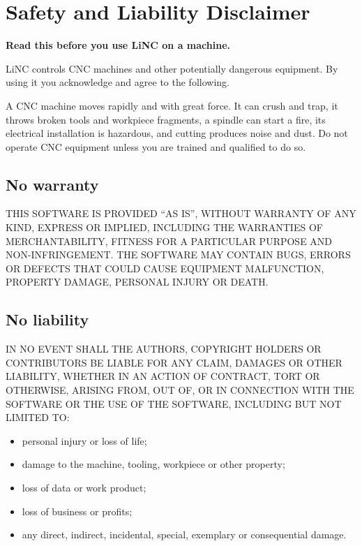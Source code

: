 \chapter*{Safety and Liability Disclaimer}

\textbf{Read this before you use LiNC on a machine.}

LiNC controls CNC machines and other potentially dangerous equipment. By using it you
acknowledge and agree to the following.

\begin{safetybox}
  A CNC machine moves rapidly and with great force. It can crush and trap, it throws broken
  tools and workpiece fragments, a spindle can start a fire, its electrical installation is
  hazardous, and cutting produces noise and dust. Do not operate CNC equipment unless you
  are trained and qualified to do so.
\end{safetybox}

\section*{No warranty}

THIS SOFTWARE IS PROVIDED ``AS IS'', WITHOUT WARRANTY OF ANY KIND, EXPRESS OR IMPLIED,
INCLUDING THE WARRANTIES OF MERCHANTABILITY, FITNESS FOR A PARTICULAR PURPOSE AND
NON-INFRINGEMENT. THE SOFTWARE MAY CONTAIN BUGS, ERRORS OR DEFECTS THAT COULD CAUSE
EQUIPMENT MALFUNCTION, PROPERTY DAMAGE, PERSONAL INJURY OR DEATH.

\section*{No liability}

IN NO EVENT SHALL THE AUTHORS, COPYRIGHT HOLDERS OR CONTRIBUTORS BE LIABLE FOR ANY CLAIM,
DAMAGES OR OTHER LIABILITY, WHETHER IN AN ACTION OF CONTRACT, TORT OR OTHERWISE, ARISING
FROM, OUT OF, OR IN CONNECTION WITH THE SOFTWARE OR THE USE OF THE SOFTWARE, INCLUDING
BUT NOT LIMITED TO:

\begin{itemize}
  \item personal injury or loss of life;
  \item damage to the machine, tooling, workpiece or other property;
  \item loss of data or work product;
  \item loss of business or profits;
  \item any direct, indirect, incidental, special, exemplary or consequential damage.
\end{itemize}

